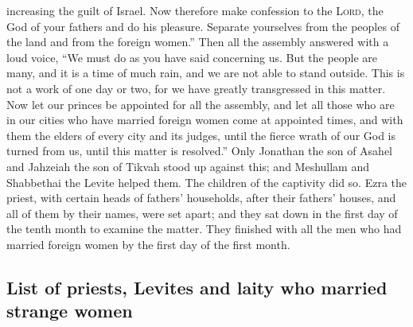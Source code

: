 increasing the guilt of Israel.  Now therefore make
confession to the \textsc{Lord}, the God of your fathers and do his
pleasure. Separate yourselves from the peoples of the land and from the
foreign women.''  Then all the assembly answered with a
loud voice, ``We must do as you have said concerning us. 
But the people are many, and it is a time of much rain, and we are not
able to stand outside. This is not a work of one day or two, for we have
greatly transgressed in this matter.  Now let our princes
be appointed for all the assembly, and let all those who are in our
cities who have married foreign women come at appointed times, and with
them the elders of every city and its judges, until the fierce wrath of
our God is turned from us, until this matter is resolved.''
 Only Jonathan the son of Asahel and Jahzeiah the son of
Tikvah stood up against this; and Meshullam and Shabbethai the Levite
helped them.  The children of the captivity did so. Ezra
the priest, with certain heads of fathers' households, after their
fathers' houses, and all of them by their names, were set apart; and
they sat down in the first day of the tenth month to examine the matter.
 They finished with all the men who had married foreign
women by the first day of the first month.

\hypertarget{list-of-priests-levites-and-laity-who-married-strange-women}{%
\subsection{List of priests, Levites and laity who married strange
women}\label{list-of-priests-levites-and-laity-who-married-strange-women}}

